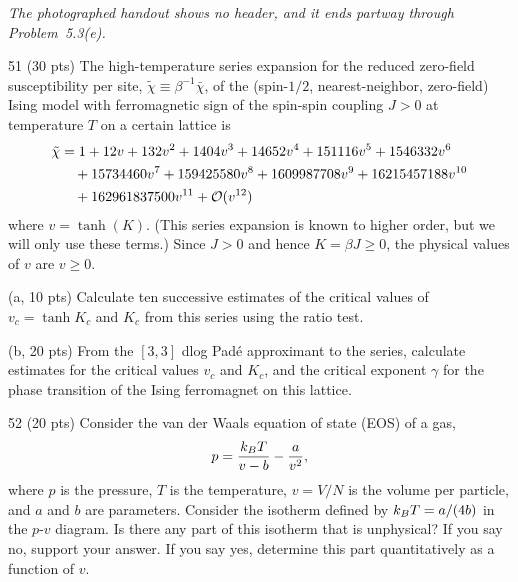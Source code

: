 
\noindent\emph{The photographed handout shows no header, and it ends partway through Problem~5.3(e).}

\begin{hwproblem}{5}{1}
(30 pts) The high-temperature series expansion for the reduced zero-field susceptibility per site,
$\tilde\chi\equiv\beta^{-1}\bar\chi$, of the (spin-$1/2$, nearest-neighbor, zero-field) Ising model with ferromagnetic
sign of the spin-spin coupling $J>0$ at temperature $T$ on a certain lattice is
\begin{align}
  \tilde\chi &= 1+12v+132v^2+1404v^3+14652v^4+151116v^5+1546332v^6\nonumber\\
  &\quad+15734460v^7+159425580v^8+1609987708v^9+16215457188v^{10}\nonumber\\
  &\quad+162961837500v^{11}+\mathcal{O}(v^{12})
\end{align}
where $v = \tanh(K)$. (This series expansion is known to higher order, but we will only use these terms.) Since $J>0$
and hence $K = \beta J\ge 0$, the physical values of $v$ are $v\ge 0$.
\begin{hwparts}
  \item (a, 10 pts) Calculate ten successive estimates of the critical values of $v_c = \tanh K_c$ and $K_c$ from this
    series using the ratio test.
  \item (b, 20 pts) From the $[3,3]$ dlog Pad\'e approximant to the series, calculate estimates for the critical values
    $v_c$ and $K_c$, and the critical exponent $\gamma$ for the phase transition of the Ising ferromagnet on this
    lattice.
\end{hwparts}
\end{hwproblem}

\begin{hwproblem}{5}{2}
(20 pts) Consider the van der Waals equation of state (EOS) of a gas,
\begin{equation}
  p = \frac{k_{B} T}{v-b}-\frac{a}{v^2},
\end{equation}
where $p$ is the pressure, $T$ is the temperature, $v = V/N$ is the volume per particle, and $a$ and $b$ are
parameters. Consider the isotherm defined by $k_{B} T = a/(4b)$ in the $p$-$v$ diagram. Is there any part of this
isotherm that is unphysical? If you say no, support your answer. If you say yes, determine this part quantitatively as
a function of $v$.
\end{hwproblem}


